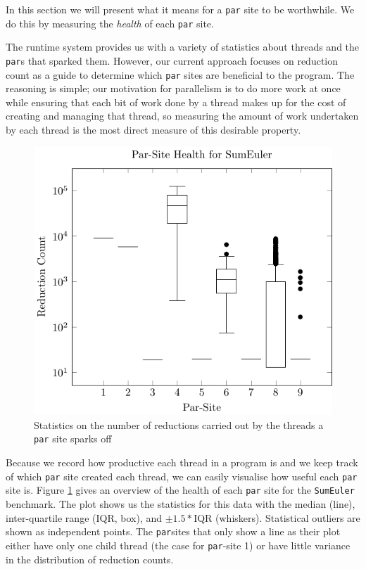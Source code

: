 In this section we will present what it means for a \verb|par| site to be
worthwhile. We do this by measuring the \emph{health} of each \verb|par| site.

The runtime system provides us with a variety of statistics about threads and
the \verb|par|s that sparked them. However, our current approach focuses on
reduction count as a guide to determine which \verb-par- sites are beneficial
to the program.  The reasoning is simple; our motivation for parallelism is to
do more work at once while ensuring that each bit of work done by a thread
makes up for the cost of creating and managing that thread, so measuring the
amount of work undertaken by each thread is the most direct measure of this
desirable property.

\begin{figure}
  \includegraphics[width=\linewidth]{Informed/Figures/threadhealth.pdf}
\caption{Statistics on the number of reductions carried out by the threads a
\texttt{par} site sparks off}
\label{fig:sumHist}
\end{figure}

Because we record how productive each thread in a program is and we keep track
of which \verb-par- site created each thread, we can easily visualise how
useful each \verb-par- site is. Figure \ref{fig:sumHist} gives an overview of
the health of each \verb-par- site for the \verb|SumEuler| benchmark. The plot
shows us the statistics for this data with the median (line), inter-quartile
range (IQR, box), and $\pm1.5 * $IQR (whiskers).  Statistical outliers are
shown as independent points. The \verb-par-sites that only show a line as their
plot either have only one child thread (the case for \verb-par--site 1) or have
little variance in the distribution of reduction counts.

